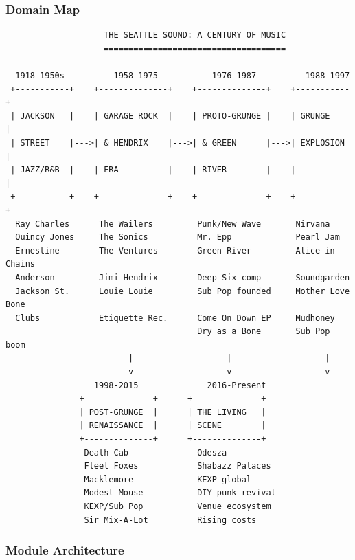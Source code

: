 \documentclass[11pt,letterpaper]{article}
\begin{document}
\subsubsection{Domain Map}

\begin{asciibox}
\begin{verbatim}
                    THE SEATTLE SOUND: A CENTURY OF MUSIC
                    =====================================

  1918-1950s          1958-1975           1976-1987          1988-1997
 +-----------+    +--------------+    +--------------+    +-----------+
 | JACKSON   |    | GARAGE ROCK  |    | PROTO-GRUNGE |    | GRUNGE    |
 | STREET    |--->| & HENDRIX    |--->| & GREEN      |--->| EXPLOSION |
 | JAZZ/R&B  |    | ERA          |    | RIVER        |    |           |
 +-----------+    +--------------+    +--------------+    +-----------+
  Ray Charles      The Wailers         Punk/New Wave       Nirvana
  Quincy Jones     The Sonics          Mr. Epp             Pearl Jam
  Ernestine        The Ventures        Green River         Alice in Chains
  Anderson         Jimi Hendrix        Deep Six comp       Soundgarden
  Jackson St.      Louie Louie         Sub Pop founded     Mother Love Bone
  Clubs            Etiquette Rec.      Come On Down EP     Mudhoney
                                       Dry as a Bone       Sub Pop boom
                         |                   |                   |
                         v                   v                   v
                  1998-2015              2016-Present
               +--------------+      +--------------+
               | POST-GRUNGE  |      | THE LIVING   |
               | RENAISSANCE  |      | SCENE        |
               +--------------+      +--------------+
                Death Cab              Odesza
                Fleet Foxes            Shabazz Palaces
                Macklemore             KEXP global
                Modest Mouse           DIY punk revival
                KEXP/Sub Pop           Venue ecosystem
                Sir Mix-A-Lot          Rising costs
\end{verbatim}
\end{asciibox}

\subsubsection{Module Architecture}
\end{document}
